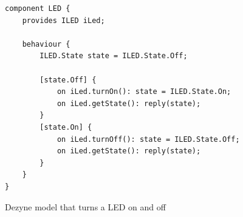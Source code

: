 \documentclass[12pt]{scrreprt}
\begin{document}
\begin{appendices}
\begin{listing}[!ht]
\begin{verbatim}
component LED {
    provides ILED iLed;

    behaviour {
        ILED.State state = ILED.State.Off;

        [state.Off] {
            on iLed.turnOn(): state = ILED.State.On;
            on iLed.getState(): reply(state);
        }
        [state.On] {
            on iLed.turnOff(): state = ILED.State.Off;
            on iLed.getState(): reply(state);
        }
    }
}

\end{verbatim}
\caption{Dezyne model that turns a LED on and off}
\label{fig:theoretical_background_dezyne_model}
\end{listing}



\end{appendices}
\end{document}
